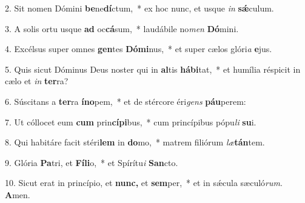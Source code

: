 \item 2. Sit nomen Dómini \textbf{be}ne\textbf{dí}ctum,~* ex hoc nunc, et usque \textit{in} \textbf{sǽ}culum.

\item 3. A solis ortu usque \textbf{ad} oc\textbf{cá}sum,~* laudábile no\textit{men} \textbf{Dó}mini.

\item 4. Excélsus super omnes \textbf{gen}tes \textbf{Dó}\textbf{mi}nus,~* et super cælos glóri\textit{a} \textbf{e}jus.

\item 5. Quis sicut Dóminus Deus noster qui in \textbf{al}tis \textbf{há}\textbf{bi}tat,~* et humília réspicit in cælo et \textit{in} \textbf{ter}ra?

\item 6. Súscitans a \textbf{ter}ra \textbf{ín}\textbf{o}pem,~* et de stércore éri\textit{gens} \textbf{páu}perem:

\item 7. Ut cóllocet eum \textbf{cum} prin\textbf{cí}\textbf{pi}bus,~* cum princípibus pópu\textit{li} \textbf{su}i.

\item 8. Qui habitáre facit stéri\textbf{lem} in \textbf{do}mo,~* matrem filiórum \textit{læ}\textbf{tán}tem.

\item 9. Glória \textbf{Pa}tri, et \textbf{Fíli}o,~* et Spírítu\textit{i} \textbf{San}cto.

\item 10. Sicut erat in princípio, et \textbf{nunc,} et \textbf{sem}per,~* et in sǽcula sæculó\textit{rum}. \textbf{A}men.

